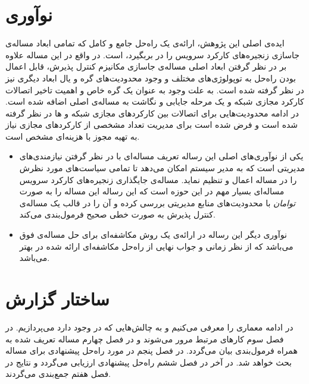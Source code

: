 \section{نوآوری}
ایده‌ی اصلی این پژوهش، ارائه‌ی یک راه‌حل جامع و کامل که تمامی ابعاد مساله‌ی جاسازی
زنجیره‌های کارکرد سرویس را در بربگیرد، است.
در واقع در این مساله علاوه بر در نظر گرفتن ابعاد اصلی مساله‌ی جاسازی مکانیزم کنترل پذیرش،
قابل اعمال بودن راه‌حل به توپولوژی‌های مختلف و وجود محدودیت‌های گره و یال ابعاد دیگری نیز در نظر گرفته شده است.
به علت وجود 
به عنوان یک گره خاص و اهمیت تاخیر اتصالات کارکرد مجازی شبکه و 
یک مرحله جایابی و نگاشت به مساله‌ی اصلی اضافه شده است.
در ادامه محدودیت‌هایی برای اتصالات بین کارکردهای مجازی شبکه و ها
در نظر گرفته شده است و فرض شده است برای مدیریت تعداد مشخصی از کارکردهای مجازی نیاز به تهیه
مجوز با هزینه‌ای مشخص است.

\begin{itemize}
    \item
    یکی از نوآوری‌های اصلی این رساله تعریف مساله‌ای با در نظر گرفتن نیازمندی‌های مدیریتی است
    که به مدیر سیستم امکان می‌دهد تا تمامی سیاست‌های مورد نظرش را در مساله اعمال و تنظیم نماید.
    مساله‌ی جایگذاری زنجیره‌های کارکرد سرویس مساله‌ای بسیار مهم در این حوزه است
    که این رساله این مساله را به صورت \emph{توامان} با محدودیت‌های منابع مدیریتی بررسی کرده و
    آن را در قالب یک مساله‌ی کنترل پذیرش به صورت خطی صحیح فرمول‌بندی می‌کند.
    \item
    نوآوری دیگر این رساله در ارائه‌ی یک روش مکاشفه‌ای برای حل مساله‌ی فوق می‌باشد
    که از نظر زمانی و جواب نهایی از راه‌حل مکاشفه‌ای ارائه شده در
    \cite{Bari2015}
    بهتر می‌باشد.
\end{itemize}

\section{ساختار گزارش}
در ادامه معماری 
را معرفی می‌کنیم
و به چالش‌هایی که در  وجود دارد می‌پردازیم.
در فصل سوم کارهای مرتبط مرور می‌شوند و در فصل چهارم مساله تعریف شده به همراه فرمول‌بندی بیان می‌گردد. در فصل پنجم
در مورد راه‌حل پیشنهادی برای مساله بحث خواهد شد.
در آخر در فصل ششم راه‌حل پیشنهادی ارزیابی می‌گردد
و نتایج در فصل هفتم جمع‌بندی می‌گردند.
